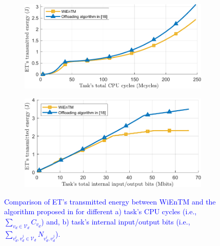 \documentclass[12pt,draftclsnofoot,onecolumn]{IEEEtran}
\begin{document}
\begin{enumerate}
\setcounter{figure}{7}
\begin{figure}
	\centering
	\begin{subfigure}[b]{.43\textwidth}
		\centering
		\includegraphics[width=\linewidth]{simulation2_a.pdf}
		\caption{} \label{fig:7arr}
	\end{subfigure}
	\begin{subfigure}[b]{.43\textwidth}
		\centering
		\includegraphics[width=\linewidth]{simulation2_b.pdf}
		\caption{} \label{fig:7brr}
	\end{subfigure}
	
	\caption{\textcolor{blue}{Comparison of ET's transmitted energy between WiEnTM and the algorithm proposed in \cite{b13} for different a) task's CPU cycles (i.e., $\sum_{v_d\in\mathcal{V}_d}C_{v_d}$) and, b) task's internal input/output bits (i.e., $\sum_{v_d^i,v_d^j\in\mathcal{V}_d}N_{v_d^i,v_d^j}$).}} \label{fig:7rr}
\end{figure}


\end{enumerate}
\end{document}
